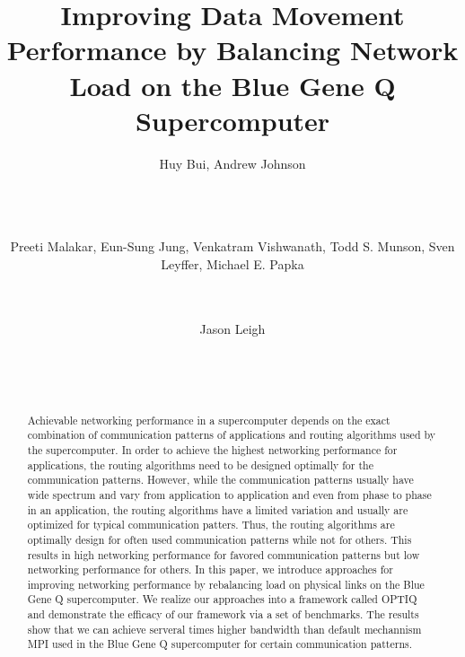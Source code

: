 \documentclass{acm_proc_article-sp}
\begin{document}
\title{Improving Data Movement Performance by Balancing Network Load on the Blue Gene Q Supercomputer}

\author{
\alignauthor Huy Bui, Andrew Johnson\\
       \\
       \\
       \\
\and  %
\alignauthor Preeti Malakar, Eun-Sung Jung, Venkatram Vishwanath, Todd S. Munson, Sven Leyffer, Michael E. Papka\\
       \\
       \\
\and
\alignauthor Jason Leigh\\
       \\
       \\
       \\
}

\maketitle
\begin{abstract}
Achievable networking performance in a supercomputer depends on the exact combination of communication patterns of applications and routing algorithms used by the supercomputer. In order to achieve the highest networking performance for applications, the routing algorithms need to be designed optimally for the communication patterns. However, while the communication patterns usually have wide spectrum and vary from application to application and even from phase to phase in an application, the routing algorithms have a limited variation and usually are optimized for typical communication patters. Thus, the routing algorithms are optimally design for often used communication patterns while not for others. This results in high networking performance for favored communication patterns but low networking performance for others. In this paper, we introduce approaches for improving networking performance by rebalancing load on physical links on the Blue Gene Q supercomputer. We realize our approaches into a framework called OPTIQ and demonstrate the efficacy of our framework via a set of benchmarks. The results show that we can achieve serveral times higher bandwidth than default mechannism MPI used in the Blue Gene Q supercomputer for certain communication patterns.
\end{abstract}
\end{document}
